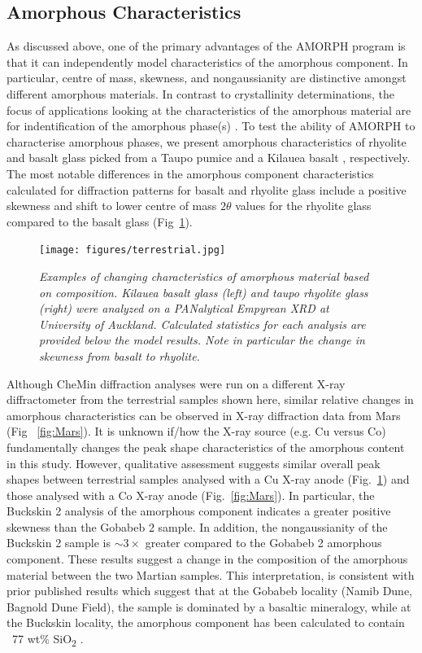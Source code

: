 \documentclass[review]{elsarticle}
\begin{document}
\subsection{Amorphous Characteristics}
As discussed above, one of the primary advantages of the AMORPH program is that it can
independently model characteristics of the amorphous component.  In particular, centre of mass,
skewness, and nongaussianity are distinctive amongst different amorphous materials. In contrast to crystallinity determinations, the focus of applications looking at the characteristics of the amorphous material are for indentification of the amorphous phase(s) \citep[e.g.,][]{dehouck2014}. To test
the ability of AMORPH to characterise amorphous phases, we present amorphous characteristics of rhyolite and basalt glass picked from a
Taupo pumice \citep[73.5 wt\% SiO\textsubscript{2}; P2166C;][]{barker2015} and a Kilauea basalt
\citep[51 wt\% SiO\textsubscript{2}; KS08-108E;][]{wooten2009, rowe2015}, respectively.
The most notable differences in the amorphous component characteristics calculated for diffraction patterns for basalt and rhyolite glass include a positive skewness and shift to lower centre of mass
$2\theta$ values for the rhyolite glass compared to the basalt glass (Fig~\ref{fig:terrestrial}). 

\begin{figure}[!ht]
\centering
\texttt{[image: figures/terrestrial.jpg]}
\caption{\it Examples of changing characteristics of amorphous material based on composition. Kilauea basalt glass (left) and taupo rhyolite glass (right) were analyzed on a PANalytical Empyrean XRD at University of Auckland. Calculated statistics for each analysis are provided below the model results. Note in particular the change in skewness from basalt to rhyolite.\label{fig:terrestrial}}
\end{figure}

Although CheMin
diffraction analyses were run on a different X-ray diffractometer from the terrestrial
samples shown here, similar relative changes in amorphous characteristics can be observed
in X-ray diffraction data from Mars (Fig ~\ref{fig:Mars}). It is unknown if/how the X-ray source (e.g. Cu versus Co) fundamentally changes the peak shape characteristics of the amorphous content in this study. However, qualitative assessment suggests similar overall peak shapes between terrestrial samples analysed with a Cu X-ray anode (Fig.~\ref{fig:terrestrial}) and those analysed with a Co X-ray anode (Fig.~\ref{fig:Mars}). In particular, the Buckskin 2 analysis of the amorphous component indicates a greater positive skewness than the Gobabeb 2 sample. In addition, the nongaussianity of the Buckskin 2 sample is $\sim 3\times$ greater compared to the Gobabeb 2 amorphous component. These results suggest a change in the
composition of the amorphous material between the two Martian samples. This interpretation, is consistent with prior
published results which suggest that at the Gobabeb locality (Namib Dune, Bagnold Dune Field),
the sample is dominated by a basaltic mineralogy, while at the Buckskin locality,
the amorphous component has been calculated to contain ~77 wt\% SiO\textsubscript{2}
\citep[i.e. rhyolitic;][]{morris2016, achilles2017}. 
\end{document}
